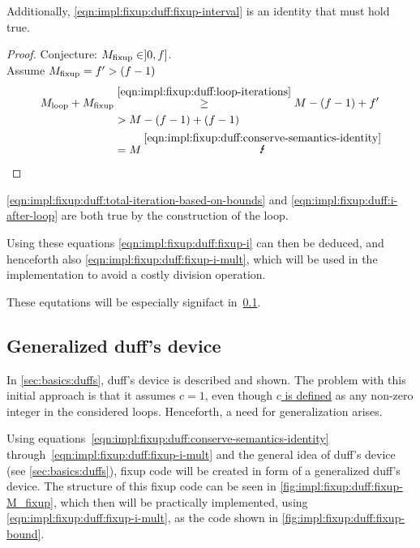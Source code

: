 Additionally, \cref{eqn:impl:fixup:duff:fixup-interval} is an identity that must hold true.
\begin{proof}\label{proof:impl:fixup:duff:fixup-interval}
Conjecture: $M_{\text{fixup}} \in \rbrack 0,  f \rbrack$.\\

Assume $M_{\text{fixup}} = f' > (f - 1)$
\begin{align*}
    \Mloop + \Mfixup &\overset{\ref{eqn:impl:fixup:duff:loop-iterations}}{\geq} M - (f - 1) + f' \\
    &> M - (f - 1) + (f - 1) \\
    &= M \medspace \overset{\ref{eqn:impl:fixup:duff:conserve-semantics-identity}}{\mLightning}
\end{align*}
\end{proof}

\cref{eqn:impl:fixup:duff:total-iteration-based-on-bounds} and \cref{eqn:impl:fixup:duff:i-after-loop} are both true by the construction of the loop.

Using these equations \cref{eqn:impl:fixup:duff:fixup-i} can then be deduced, and henceforth also \cref{eqn:impl:fixup:duff:fixup-i-mult}, which will be used in the implementation to avoid a costly division operation.

These equtations will be especially signifact in~\cref{sec:impl:fixup:duff}.

\subsection{Generalized duff's device}\label{sec:impl:fixup:duff}

In \cref{sec:basics:duffs}, duff's device is described and shown.
The problem with this initial approach is that it assumes $c = 1$, even though \hyperref[sec:impl::def-c]{$c$ is defined} as any non-zero integer in the considered loops.
Henceforth, a need for generalization arises.

Using equations~\ref{eqn:impl:fixup:duff:conserve-semantics-identity} through~\ref{eqn:impl:fixup:duff:fixup-i-mult} and the general idea of duff's device (see \cref{sec:basics:duffs}), fixup code will be created in form of a generalized duff's device.
The structure of this fixup code can be seen in \cref{fig:impl:fixup:duff:fixup-M_fixup}, which then will be practically implemented, using \cref{eqn:impl:fixup:duff:fixup-i-mult}, as the code shown in \cref{fig:impl:fixup:duff:fixup-bound}.



